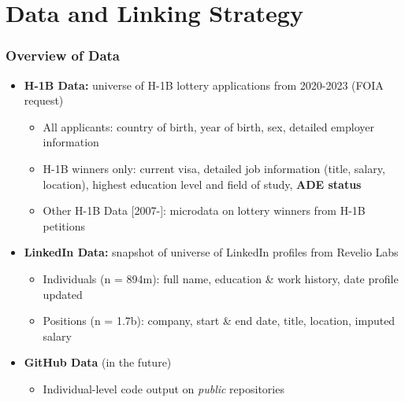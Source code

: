 \documentclass[xcolor=dvipsnames, compress, 12pt, aspectratio=169, handout]{beamer}
\begin{document}
\section{Data and Linking Strategy}
\begin{frame}
    \frametitle{Overview of Data}
    \begin{itemize}
        \item \textbf{H-1B Data:} universe of H-1B lottery applications from 2020-2023 (FOIA request)
        \begin{itemize}
            \item All applicants: country of birth, year of birth, sex, detailed employer information
            \vspace{2mm}
            \item H-1B winners only: current visa, detailed job information (title, salary, location), highest education level and field of study, \textbf{ADE status}
            \vspace{2mm}
            \item Other H-1B Data [2007-]: microdata on lottery winners from H-1B petitions
        \end{itemize} 
        \vspace{4mm}
        \item \textbf{LinkedIn Data:} snapshot of universe of LinkedIn profiles from Revelio Labs
        \begin{itemize}
            \item Individuals (n = 894m): full name, education \& work history, date profile updated
            \vspace{2mm}
            \item Positions (n = 1.7b): company, start \& end date, title, location, imputed salary
        \end{itemize}
        \vspace{4mm}
        \item \textbf{GitHub Data} (in the future)
        \begin{itemize}
            \item Individual-level code output on \textit{public} repositories
        \end{itemize}
    \end{itemize}
\end{frame}
\end{document}
